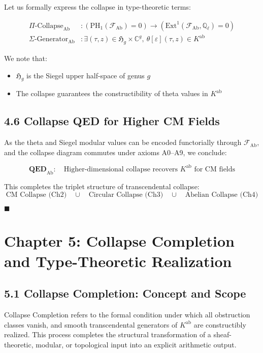 \documentclass[11pt]{article}
\begin{document}
Let us formally express the collapse in type-theoretic terms:

\begin{align*}
\Pi\text{-Collapse}_{\mathrm{Ab}} &\colon \left(\mathrm{PH}_1(\mathcal{F}_{\mathrm{Ab}}) = 0 \right) \rightarrow \left(\mathrm{Ext}^1(\mathcal{F}_{\mathrm{Ab}}, \mathbb{Q}_\ell) = 0 \right) \\
\Sigma\text{-Generator}_{\mathrm{Ab}} &\colon \exists (\tau, z) \in \mathfrak{H}_g \times \mathbb{C}^g,\ \theta[\varepsilon](\tau, z) \in K^{\mathrm{ab}}
\end{align*}


We note that:
\begin{itemize}
    \item \(\mathfrak{H}_g\) is the Siegel upper half-space of genus \( g \)
    \item The collapse guarantees the constructibility of theta values in \( K^{\mathrm{ab}} \)
\end{itemize}

\subsection{4.6 Collapse QED for Higher CM Fields}

As the theta and Siegel modular values can be encoded functorially through \( \mathcal{F}_{\mathrm{Ab}} \), and the collapse diagram commutes under axioms A0–A9, we conclude:

\[
\textbf{QED}_{\mathrm{Ab}}: \quad \text{Higher-dimensional collapse recovers } K^{\mathrm{ab}} \text{ for CM fields}
\]

This completes the triplet structure of transcendental collapse:
\[
\text{CM Collapse (Ch2)} \quad \cup \quad \text{Circular Collapse (Ch3)} \quad \cup \quad \text{Abelian Collapse (Ch4)}
\]

\hfill $\blacksquare$



\section{Chapter 5: Collapse Completion and Type-Theoretic Realization}

\subsection{5.1 Collapse Completion: Concept and Scope}

Collapse Completion refers to the formal condition under which all obstruction classes vanish, and smooth transcendental generators of \( K^{\mathrm{ab}} \) are constructibly realized. This process completes the structural transformation of a sheaf-theoretic, modular, or topological input into an explicit arithmetic output.
\end{document}
